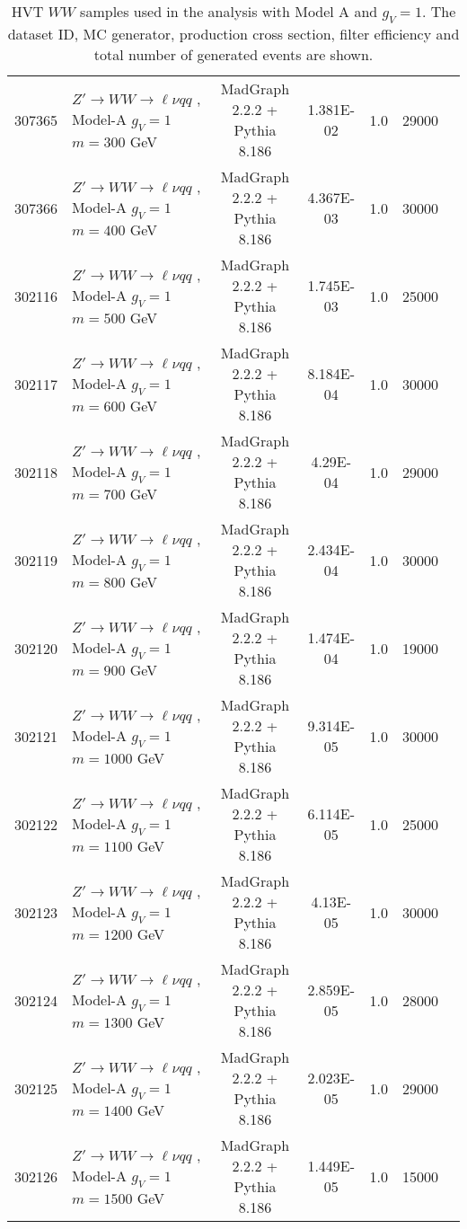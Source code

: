 \begin{landscape}
	\begin{table}[!htb]
		\caption{HVT $WW$ samples used in the analysis with Model A and $g_V=1$. The dataset ID, MC generator, production cross section, filter efficiency and total number of generated events are shown.}
		\label{tabular:mc_samples_Zprime}
		\begin{footnotesize}
			\begin{center}
				\begin{tabular}{|c|l|c|c|c|c|r|}
					\hline
					307365 & $Z' \to WW \to \ell\nu qq $ , Model-A $g_V=1$ $m=300$  GeV& MadGraph 2.2.2 + Pythia 8.186 & 1.381E-02 &1.0& 29000 \\
					307366 & $Z' \to WW \to \ell\nu qq $ , Model-A $g_V=1$ $m=400$  GeV& MadGraph 2.2.2 + Pythia 8.186 & 4.367E-03 &1.0& 30000 \\
					302116 & $Z' \to WW \to \ell\nu qq $ , Model-A $g_V=1$ $m=500$  GeV& MadGraph 2.2.2 + Pythia 8.186 & 1.745E-03  &1.0& 25000 \\
					302117 & $Z' \to WW \to \ell\nu qq $ , Model-A $g_V=1$ $m=600$  GeV& MadGraph 2.2.2 + Pythia 8.186 & 8.184E-04  &1.0& 30000 \\
					302118 & $Z' \to WW \to \ell\nu qq $ , Model-A $g_V=1$ $m=700$  GeV& MadGraph 2.2.2 + Pythia 8.186 & 4.29E-04   &1.0& 29000 \\
					302119 & $Z' \to WW \to \ell\nu qq $ , Model-A $g_V=1$ $m=800$  GeV& MadGraph 2.2.2 + Pythia 8.186 & 2.434E-04  &1.0& 30000 \\
					302120 & $Z' \to WW \to \ell\nu qq $ , Model-A $g_V=1$ $m=900$  GeV& MadGraph 2.2.2 + Pythia 8.186 & 1.474E-04  &1.0& 19000 \\
					302121 & $Z' \to WW \to \ell\nu qq $ , Model-A $g_V=1$ $m=1000$ GeV& MadGraph 2.2.2 + Pythia 8.186 & 9.314E-05  &1.0& 30000 \\
					302122 & $Z' \to WW \to \ell\nu qq $ , Model-A $g_V=1$ $m=1100$ GeV& MadGraph 2.2.2 + Pythia 8.186 & 6.114E-05  &1.0& 25000 \\
					302123 & $Z' \to WW \to \ell\nu qq $ , Model-A $g_V=1$ $m=1200$ GeV& MadGraph 2.2.2 + Pythia 8.186 & 4.13E-05   &1.0& 30000 \\
					302124 & $Z' \to WW \to \ell\nu qq $ , Model-A $g_V=1$ $m=1300$ GeV& MadGraph 2.2.2 + Pythia 8.186 & 2.859E-05  &1.0& 28000 \\
					302125 & $Z' \to WW \to \ell\nu qq $ , Model-A $g_V=1$ $m=1400$ GeV& MadGraph 2.2.2 + Pythia 8.186 & 2.023E-05  &1.0& 29000 \\
					302126 & $Z' \to WW \to \ell\nu qq $ , Model-A $g_V=1$ $m=1500$ GeV& MadGraph 2.2.2 + Pythia 8.186 & 1.449E-05  &1.0& 15000 \\

\end{tabular}
\end{center}
\end{footnotesize}
\end{table}
\end{landscape}
